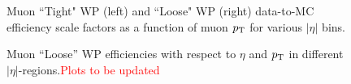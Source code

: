 \begin{figure}[htbp]
\begin{center}
  \caption{Muon ``Tight" WP (left) and ``Loose" WP (right) data-to-MC efficiency scale factors as a function of muon $p_\mathrm{T}$ for various $|\eta|$ bins.}
  \label{fig:mu_sf}
\end{center}
\end{figure}


\begin{figure}[htbp]
\begin{center}
  \caption{Muon ``Loose'' WP efficiencies with respect to  $\eta$ and  $p_\mathrm{T}$ in different $|\eta|$-regions.\textcolor{red}{Plots to be updated}}
  \label{fig:mulooseeff}
\end{center}
\end{figure}


